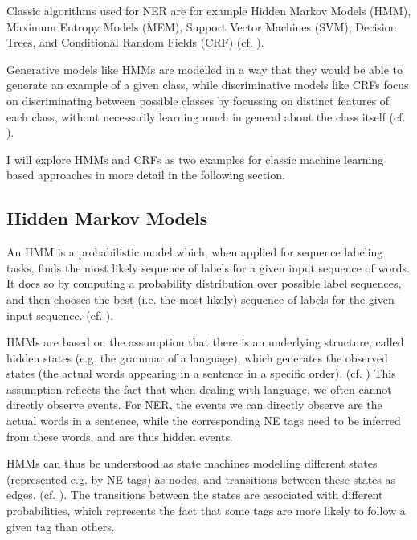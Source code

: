 
Classic algorithms used for NER are for example Hidden Markov Models (HMM), Maximum Entropy Models (MEM), Support Vector Machines (SVM), Decision Trees, and Conditional Random Fields (CRF) (cf.  \cite{yadav_survey_2019}). 

Generative models like HMMs are modelled in a way that they would be able to generate an example of a given class, while discriminative models like CRFs focus on discriminating between possible classes by focussing on distinct features of each class, without necessarily learning much in general about the class itself (cf. \cite[77]{jurafsky_2021_5}).

I will explore HMMs and CRFs as two examples for classic machine learning based approaches in more detail in the following section. 

\subsection{Hidden Markov Models}

An HMM is a probabilistic model which, when applied for sequence labeling tasks, finds the most likely sequence of labels for a given input sequence of words. It does so by computing a probability distribution over possible label sequences, and then chooses the best (i.e. the most likely) sequence of labels for the given input sequence. (cf. \cite[8]{jurafsky_2021_8}).

HMMs are based on the assumption that there is an underlying structure, called hidden states (e.g. the grammar of a language), which generates the observed states (the actual words appearing in a sentence in a specific order). (cf. \cite[9]{jurafsky_2021_8}) This assumption reflects the fact that when dealing with language, we often cannot directly observe events. For NER, the events we can directly observe are the actual words in a sentence, while the corresponding NE tags need to be inferred from these words, and are thus hidden events. 

HMMs can thus be understood as state machines modelling different states (represented e.g. by NE tags) as nodes, and transitions between these states as edges. (cf. \cite[8]{jurafsky_2021_8}). The transitions between the states are associated with different probabilities, which represents the fact that some tags are more likely to follow a given tag than others.   


